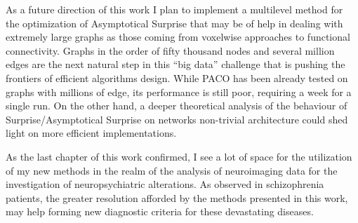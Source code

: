 As a future direction of this work I plan to implement a multilevel method for the optimization of Asymptotical Surprise that may be of help in dealing with extremely large graphs as those coming from voxelwise approaches to functional connectivity.
Graphs in the order of fifty thousand nodes and several million edges are the next natural step in this ``big data'' challenge that is pushing the frontiers of efficient algorithms design.
While PACO has been already tested on graphs with millions of edge, its performance is still poor, requiring a week for a single run.
On the other hand, a deeper theoretical analysis of the behaviour of Surprise/Asymptotical Surprise on networks non-trivial architecture could shed light on more efficient implementations.

As the last chapter of this work confirmed, I see a lot of space for the utilization of my new methods in the realm of the analysis of neuroimaging data for the investigation of neuropsychiatric alterations. As observed in schizophrenia patients, the greater resolution afforded by the methods presented in this work, may help forming new diagnostic criteria for these devastating diseases.
